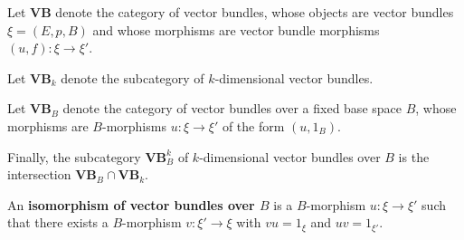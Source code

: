 Let $\mathbf{VB}$ denote the category of vector bundles, whose objects are vector bundles $\xi = (E,p,B)$ and whose morphisms are vector bundle morphisms $(u,f): \xi \to \xi'$.

Let $\mathbf{VB}_k$ denote the subcategory of $k$-dimensional vector bundles.

Let $\mathbf{VB}_B$ denote the category of vector bundles over a fixed base space $B$, whose morphisms are $B$-morphisms $u: \xi \to \xi'$ of the form $(u, 1_B)$.

Finally, the subcategory $\mathbf{VB}_B^k$ of $k$-dimensional vector bundles over $B$ is the intersection $\mathbf{VB}_B \cap \mathbf{VB}_k$.

An \textbf{isomorphism of vector bundles over $B$} is a $B$-morphism $u: \xi \to \xi'$ such that there exists a $B$-morphism $v: \xi' \to \xi$ with $vu = 1_\xi$ and $uv = 1_{\xi'}$.
